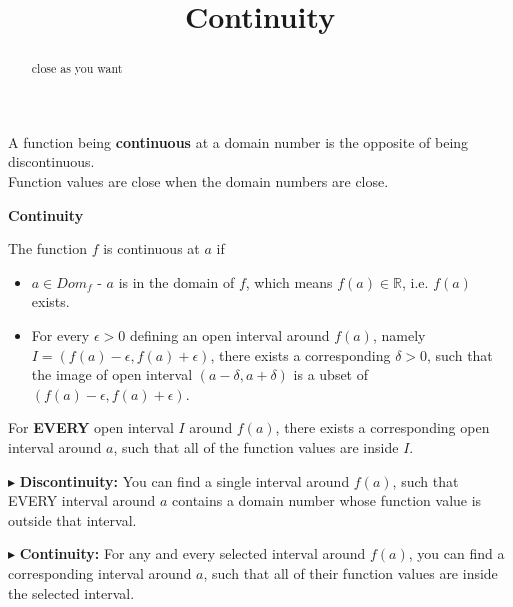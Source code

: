 \documentclass{ximera}
\title{Continuity}
\begin{document}
\begin{abstract}
close as you want
\end{abstract}
\maketitle






A function being \textbf{continuous} at a domain number is the opposite of being discontinuous. \\


Function values are close when the domain numbers are close.










\begin{definition} \textbf{\textcolor{green!50!black}{Continuity}}

The function $f$ is continuous at $a$ if


\begin{itemize}
\item $a \in Dom_f$ - $a$ is in the domain of $f$, which means $f(a) \in \mathbb{R}$, i.e. $f(a)$ exists.
\item For every $\epsilon > 0$ defining an open interval around $f(a)$, namely $I = (f(a) - \epsilon, f(a) + \epsilon)$, there exists a corresponding $\delta > 0$, such that the image of open interval $(a - \delta, a + \delta)$ is a ubset of $(f(a)-\epsilon, f(a)+\epsilon)$.
\end{itemize}


For \textbf{\textcolor{red!80!black}{EVERY}} open interval $I$ around $f(a)$, there exists a corresponding open interval around $a$, such that all of the function values are inside $I$.


\end{definition}





$\blacktriangleright$ \textbf{Discontinuity:}  You can find a single interval around $f(a)$, such that EVERY interval around $a$ contains a domain number whose function value is outside that interval.


$\blacktriangleright$ \textbf{Continuity:} For any and every selected interval around $f(a)$, you can find a corresponding interval around $a$, such that all of their function values are inside the selected interval.
\end{document}
